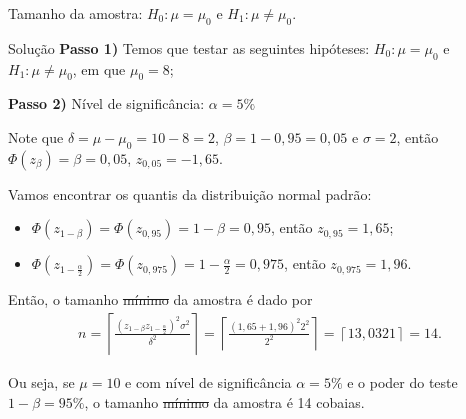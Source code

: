 \documentclass[8pt]{beamer}
\begin{document}
\begin{frame}{Tamanho da amostra: $H_0:\mu = \mu_0$ e $H_1: \mu \neq \mu_0$.}

\normalsize

\begin{block}{Solução}
	\textbf{Passo 1)} Temos que testar as seguintes hipóteses: $H_0: \mu = \mu_0$  e $H_1: \mu \neq \mu_0$, em que $\mu_0 = 8$;
	\vfill
	
	\textbf{Passo 2)} Nível de significância: $\alpha = 5\%$
	
	Note que $\delta = \mu - \mu_0 = 10 - 8 =2$, $\beta = 1 - 0,95=0,05$ e $\sigma = 2$, então $\Phi\left( z_\beta \right) = \beta = 0,05$, $z_{0,05} = -1,65$.
	
	Vamos encontrar os quantis da distribuição normal padrão:
	\begin{itemize}
		\item $\Phi\left( z_{1-\beta} \right) = \Phi\left( z_{0,95} \right) = 1-\beta = 0,95$, então $z_{0,95} = 1,65$;
		\item $\Phi\left( z_{1-\frac{\alpha}{2}} \right) = \Phi\left( z_{0,975} \right) = 1-\frac{\alpha}{2} = 0,975$, então $z_{0,975} = 1,96$.
	\end{itemize}
	\vfill
	
	 Então, o tamanho \sout{mínimo} da amostra é dado por
	\begin{align*}
		n = \left\lceil \frac{(z_{1-\beta}  z_{1-\frac{\alpha}{2}})^2 \sigma^2}{\delta^2} \right\rceil= \left\lceil \frac{(1,65 + 1,96)^2 2^2}{2^2} \right\rceil = \left\lceil 13,0321 \right\rceil  =14.
	\end{align*}
	
	Ou seja, se  $\mu=10$ e com nível de significância $\alpha=5\%$ e o poder do teste $1-\beta=95\%$, o tamanho  \sout{mínimo} da amostra  é 14 cobaias.
\end{block}

\normalsize

\end{frame}
\end{document}
